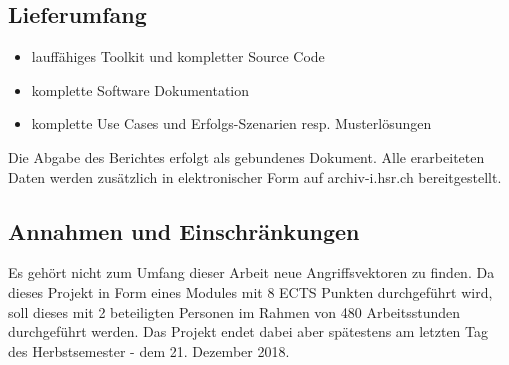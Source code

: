 \subsection{Lieferumfang}
\begin{itemize}
    \item lauffähiges Toolkit und kompletter Source Code
    \item komplette Software Dokumentation 
    \item komplette Use Cases und Erfolgs-Szenarien resp. Musterlösungen
\end{itemize}
Die Abgabe des Berichtes erfolgt als gebundenes Dokument. Alle erarbeiteten Daten werden zusätzlich in elektronischer Form auf archiv-i.hsr.ch bereitgestellt.

\subsection{Annahmen und Einschränkungen}
Es gehört nicht zum Umfang dieser Arbeit neue Angriffsvektoren zu finden. Da dieses Projekt in Form eines Modules mit 8 ECTS Punkten durchgeführt wird, soll dieses mit 2 beteiligten Personen im Rahmen von 480 Arbeitsstunden durchgeführt werden. Das Projekt endet dabei aber spätestens am letzten Tag des Herbstsemester - dem 21. Dezember 2018.